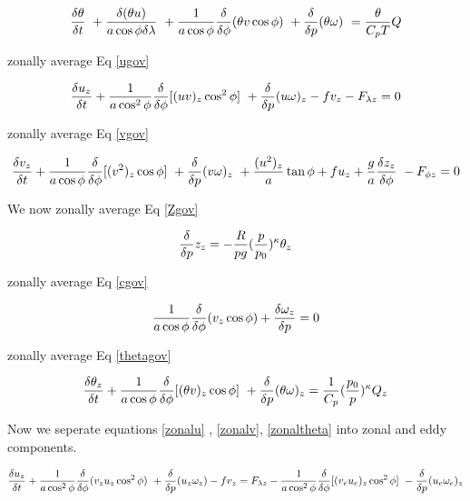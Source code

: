 \documentclass{article}
\begin{document}
\begin{equation}
\frac{\delta \theta}{\delta t} \
+ \frac{\delta (\theta u)}{a \cos{\phi} \delta \lambda} \
+ \frac{1}{a \cos{\phi}} \frac{\delta}{\delta \phi}(\theta v \cos{\phi}) \
+ \frac{\delta}{\delta p} (\theta \omega) \
= \frac{\theta}{C_p T} Q
\end{equation}

zonally average Eq \ref{ugov}

\begin{equation}
\frac{\delta u_z}{\delta t} + \frac{1}{a\cos^2{\phi}} \frac{\delta}{\delta \phi} [ (uv)_z \cos^2{\phi} ] \
+ \frac{\delta}{\delta p} (u\omega)_z - fv_z - F_{{\lambda}z} = 0
\label{zonalu}
\end{equation}

zonally average Eq \ref{vgov}

\begin{equation}
\frac{\delta v_z}{\delta t} + \frac{1}{a\cos{\phi}} \frac{\delta}{\delta \phi}[(v^2)_z \cos{\phi}] \
+ \frac{\delta}{\delta p} (v \omega)_z \
+ \frac{(u^2)_z}{a} \tan \phi + fu_z + \frac{g}{a} \frac{\delta z_z}{\delta \phi} \
- F_{{\phi}z} = 0 
\label{zonalv}
\end{equation}

We now zonally average Eq \ref{Zgov}

\begin{equation}
\frac{\delta}{\delta p} z_z = - \frac{R}{pg}(\frac{p}{p_0})^\kappa \theta_z
\label{zonaltheta}
\end{equation}

zonally average Eq \ref{cgov}

\begin{equation}
\frac{1}{a \cos{\phi}} \frac{\delta}{\delta \phi} (v_z \cos{\phi}) + \frac{\delta \omega_z}{\delta p} = 0
\label{zonalc}
\end{equation}

zonally average Eq \ref{thetagov}

\begin{equation}
\frac{\delta \theta_z}{\delta t} + \frac{1}{a\cos{\phi}} \frac{\delta}{\delta \phi} [ (\theta v)_z \cos {\phi}] \
+ \frac{\delta}{\delta p}(\theta \omega)_z = \frac{1}{C_p}(\frac{p_0}{p})^\kappa Q_z
\label{zonaltheta}
\end{equation}

Now we seperate equations \ref{zonalu} , \ref{zonalv}, \ref{zonaltheta} into 
zonal and eddy components.

\begin{equation}
\frac{\delta u_z}{\delta t} + \frac{1}{a\cos^2{\phi}} \frac{\delta}{\delta \phi} (v_z u_z \cos^2 \phi ) \
+ \frac{\delta}{\delta p} (u_z \omega_z) - f v_z = \\
F_{\lambda z} - \frac{1}{a\cos^2{\phi}} \frac{\delta}{\delta \phi} [ ( v_e u_e )_z \cos^2 \phi ] \
- \frac{\delta}{\delta p} (u_e \omega_e )_z
\label{zeu}
\end{equation}
\end{document}
